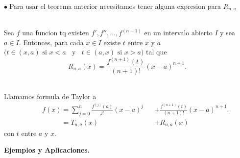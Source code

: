 \documentclass{article}
\theoremstyle{definition}
\theoremstyle{remark}
\newcommand\bl{$\bullet\;$}
\begin{document}
\bl Para usar el teorema anterior necesitamos tener alguna expresion para $R_{n,a}$
\begin{teo} \; \\
  Sea $f$ una funcion tq existen $f', f'', \dots, f^{(n+1)}$ en un intervalo abierto $I$ y sea $a \in I$. Entonces, para cada $x \in I$ existe $t$ entre $x$ y $a$ $\big(t \in (x,a) \text{ si }x<a \;\; \text{ y } \;\; t \in (a,x) \text{ si } x>a\big)$ tal que \[ 
    R_{n,a}(x)=\frac{f^{(n+1)}(t)}{(n+1)!}(x-a)^{n+1}.
  \]
\end{teo}

\begin{defi} \; \\
  Llamamos formula de Taylor a  
  \begin{align*}
   &  &&f(x)=\sum_{j=0}^{n}{\frac{f^{(j)}(a)}{j!}(x-a)^j}&&+\frac{f^{(n+1)}(t)}{(n+1)!}(x-a)^{n+1}. \\ 
   &      &&\phantom{f(x)}= T_{n,a}(x) &&+ R_{n,a}(x) 
  \end{align*}
   con $t$ entre $a$ y $x$. 
\end{defi}
\pagebreak
\begin{center}
\textbf{Ejemplos y Aplicaciones.}
\end{center}
\end{document}

